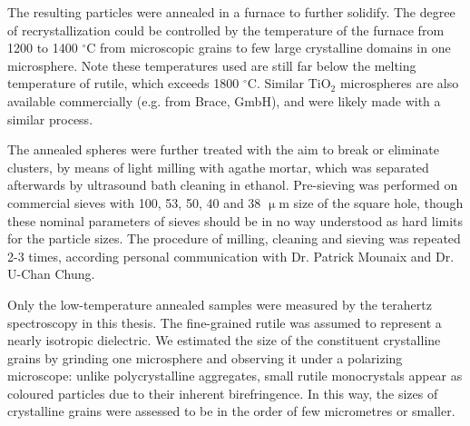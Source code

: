 The resulting particles were annealed in a furnace to further solidify. The degree of recrystallization could be controlled  by the temperature of the furnace from 1200 to 1400 $^{\circ}$C from microscopic grains to few large crystalline domains in one microsphere. Note these temperatures used are still far below the melting temperature of rutile, which exceeds 1800 $^{\circ}$C.
Similar TiO$_{2}$ microspheres are also available commercially (e.g. from Brace, GmbH), and were likely made with a similar process.

The annealed spheres were further treated with the aim to break or eliminate clusters, by means of light milling with agathe mortar, which was separated afterwards by ultrasound bath cleaning in ethanol. Pre-sieving was performed on commercial sieves with 100, 53, 50, 40 and 38 $\upmu$m size of the square hole, though these nominal parameters of sieves should be in no way understood as hard limits for the particle sizes. The procedure of milling, cleaning and sieving was repeated 2-3 times, according personal communication with Dr. Patrick Mounaix and {Dr.} U-Chan Chung.

Only the low-temperature annealed samples were measured by the terahertz spectroscopy in this thesis. The fine-grained rutile was assumed to represent a nearly isotropic dielectric. We estimated the size of the constituent crystalline grains by grinding one microsphere and observing it under a polarizing microscope: unlike polycrystalline aggregates, small rutile monocrystals appear as coloured particles due to their inherent birefringence. In this way, the sizes of crystalline grains were assessed to be in the order of few micrometres or smaller.



